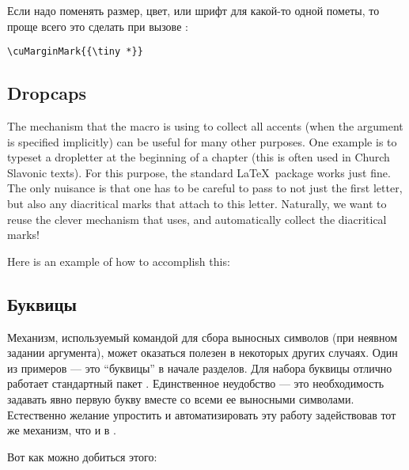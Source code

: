 \begin{RU}
Если надо поменять размер, цвет, или шрифт для какой-то одной пометы, то проще всего это сделать при
вызове :
\end{RU}

\begin{verbatim}
\cuMarginMark{{\tiny *}}
\end{verbatim}

\begin{EN}
\subsection{Dropcaps}
The mechanism that the  macro is using to collect all accents
(when the argument is specified implicitly) can be useful for
many other purposes. One example is to typeset a dropletter at the beginning of a chapter
(this is often used in Church Slavonic texts). For this purpose, the standard \LaTeX\ package
 works just fine. The only nuisance is that one has to be careful to
pass to  not just the first letter, but also any diacritical marks that
attach to this letter. Naturally, we want to reuse the
clever mechanism that  uses, and automatically collect the diacritical marks!

Here is an example of how to accomplish this:
\end{EN}

\begin{RU}
\subsection{Буквицы}
Механизм, используемый командой  для сбора выносных символов (при неявном задании аргумента), может оказаться полезен
в некоторых других случаях. Один из примеров --- это ``буквицы'' в начале разделов. Для набора буквицы отлично работает стандартный
пакет . Единственное неудобство --- это необходимость задавать явно первую букву вместе со всеми ее выносными символами.
Естественно желание упростить и автоматизировать эту работу задействовав тот же механизм, что и в .

Вот как можно добиться этого:
\end{RU}

